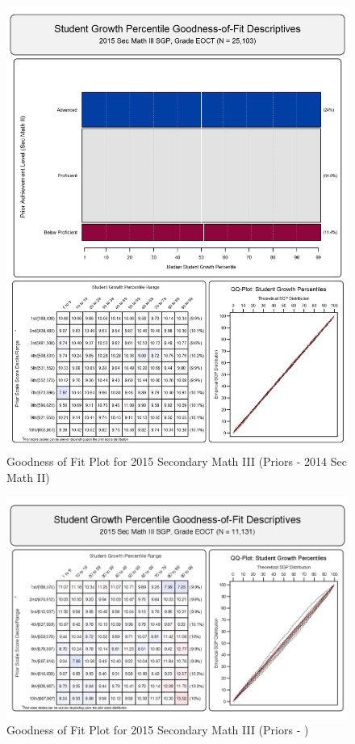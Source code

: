 \documentclass[12pt]{article}
\begin{document}
\begin{figure}[htbp]
\centering
\includegraphics{../img/Goodness_of_Fit/SEC_MATH_III.2015/2015_SEC_MATH_III_EOCT;2014_SEC_MATH_II_EOCT.png}
\caption{Goodness of Fit Plot for 2015 Secondary Math III (Priors - 2014
Sec Math II)}
\end{figure}

\begin{figure}[htbp]
\centering
\includegraphics{../img/Goodness_of_Fit/SEC_MATH_III.2015/gofSGP_SEC_III.png}
\caption{Goodness of Fit Plot for 2015 Secondary Math III (Priors - )}
\end{figure}



\end{document}
